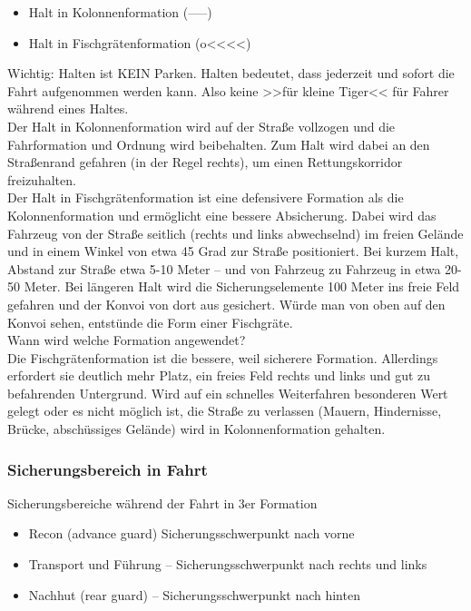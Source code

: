 	\begin{itemize}
		\item Halt in Kolonnenformation (-----)
		\item Halt in Fischgrätenformation (o<<<<)
	\end{itemize}

	Wichtig: Halten ist KEIN Parken. Halten bedeutet, dass jederzeit und sofort die Fahrt aufgenommen werden kann. Also keine >>für kleine Tiger<< für Fahrer während eines Haltes. \\
	Der Halt in Kolonnenformation wird auf der Straße vollzogen und die Fahrformation und Ordnung wird beibehalten. Zum Halt wird dabei an den Straßenrand gefahren (in der Regel rechts), um einen Rettungskorridor freizuhalten. \\
	Der Halt in Fischgrätenformation ist eine defensivere Formation als die Kolonnenformation und ermöglicht eine bessere Absicherung. Dabei wird das Fahrzeug von der Straße seitlich (rechts und links abwechselnd) im freien Gelände und in einem Winkel von etwa 45 Grad  zur Straße positioniert. Bei kurzem Halt, Abstand zur Straße etwa 5-10 Meter – und von Fahrzeug zu Fahrzeug in etwa 20-50 Meter. Bei längeren Halt wird die Sicherungselemente 100 Meter ins freie Feld gefahren und der Konvoi von dort aus gesichert. Würde man von oben auf den Konvoi sehen, entstünde die Form einer Fischgräte. \\
	Wann wird welche Formation angewendet? \\
	Die Fischgrätenformation ist die bessere, weil sicherere Formation. Allerdings erfordert sie deutlich mehr Platz, ein freies Feld rechts und links und gut zu befahrenden Untergrund. Wird auf ein schnelles Weiterfahren besonderen Wert gelegt oder es nicht möglich ist, die Straße zu verlassen (Mauern, Hindernisse, Brücke, abschüssiges Gelände) wird in Kolonnenformation gehalten. \\
\subsubsection{Sicherungsbereich in Fahrt}
Sicherungsbereiche während der Fahrt in 3er Formation

	\begin{itemize}
		\item Recon (advance guard) Sicherungsschwerpunkt nach vorne
		\item Transport und Führung -- Sicherungsschwerpunkt nach rechts und links
		\item Nachhut (rear guard) -- Sicherungsschwerpunkt nach hinten
	\end{itemize}

